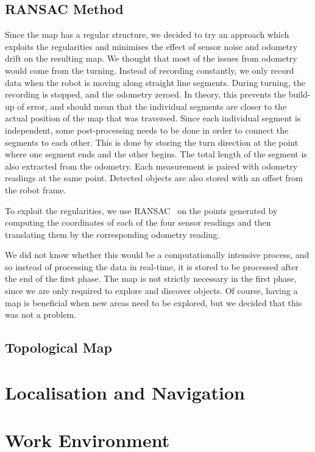 \documentclass[10pt,a4paper,twocolumn]{article}
\begin{document}
\subsection{RANSAC Method}
Since the map has a regular structure, we decided to try an approach which
exploits the regularities and minimises the effect of sensor noise and odometry
drift on the resulting map. We thought that most of the issues from odometry
would come from the turning. Instead of recording constantly, we only record
data when the robot is moving along straight line segments. During turning, the
recording is stopped, and the odometry zeroed. In theory, this prevents the
build-up of error, and should mean that the individual segments are closer to
the actual position of the map that was traversed. Since each individual segment
is independent, some post-processing needs to be done in order to connect the
segments to each other. This is done by storing the turn direction at the point
where one segment ends and the other begins. The total length of the segment is
also extracted from the odometry. Each measurement is paired with odometry
readings at the same point. Detected objects are also stored with an offset from
the robot frame.

To exploit the regularities, we use RANSAC~\cite{fischler1981random} on the
points generated by computing the coordinates of each of the four sensor
readings and then translating them by the corresponding odometry reading. 

We did not know whether this would be a computationally intensive process, and
so instead of processing the data in real-time, it is stored to be processed
after the end of the first phase. The map is not strictly necessary in the first
phase, since we are only required to explore and discover objects. Of course,
having a map is beneficial when new areas need to be explored, but we decided
that this was not a problem.

\subsection{Topological Map}
\section{Localisation and Navigation}
\section{Work Environment}
\end{document}
